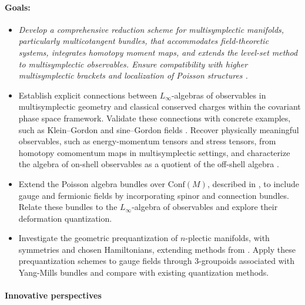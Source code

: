 \documentclass[a4paper]{article}
\begin{document}
\paragraph{Goals:}
\begin{itemize}[noitemsep,topsep=0pt,parsep=0pt,partopsep=0pt]
    \item \it Develop a comprehensive reduction scheme for multisymplectic manifolds, particularly multicotangent bundles, that accommodates field-theoretic systems, integrates homotopy moment maps, and extends the level-set method to multisymplectic observables. Ensure compatibility with higher multisymplectic brackets and localization of Poisson structures \cite{Blacker2020}.
    
    \item Establish explicit connections between $L_\infty$-algebras of observables in multisymplectic geometry and classical conserved charges within the covariant phase space framework. Validate these connections with concrete examples, such as Klein–Gordon and sine–Gordon fields \cite{Rogers2010}. Recover physically meaningful observables, such as energy-momentum tensors and stress tensors, from homotopy comomentum maps in multisymplectic settings, and characterize the algebra of on-shell observables as a quotient of the off-shell algebra \cite{Forger2005}.
    
    \item Extend the Poisson algebra bundles over $\mathrm{Conf}(M)$, described in \cite{Frabetti2024}, to include gauge and fermionic fields by incorporating spinor and connection bundles. Relate these bundles to the $L_\infty$-algebra of observables and explore their deformation quantization.
    
    
    \item Investigate the geometric prequantization of $n$-plectic manifolds, with symmetries and chosen Hamiltonians, extending methods from \cite{Sevestre2021}. Apply these prequantization schemes to gauge fields through 3-groupoids associated with Yang-Mills bundles \cite{FischerPhd} and compare with existing quantization methods.
    
\end{itemize}


\paragraph{Innovative perspectives}
\end{document}
